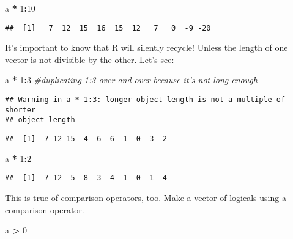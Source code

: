 \documentclass[]{article}
\newenvironment{Shaded}{\begin{snugshade}}{\end{snugshade}}
\newcommand{\DecValTok}[1]{\textcolor[rgb]{0.00,0.00,0.81}{#1}}
\newcommand{\StringTok}[1]{\textcolor[rgb]{0.31,0.60,0.02}{#1}}
\newcommand{\CommentTok}[1]{\textcolor[rgb]{0.56,0.35,0.01}{\textit{#1}}}
\newcommand{\OperatorTok}[1]{\textcolor[rgb]{0.81,0.36,0.00}{\textbf{#1}}}
\newcommand{\NormalTok}[1]{#1}
\begin{document}
\begin{Shaded}
\begin{Highlighting}[]
\NormalTok{a }\OperatorTok{*}\StringTok{ }\DecValTok{1}\OperatorTok{:}\DecValTok{10}
\end{Highlighting}
\end{Shaded}

\begin{verbatim}
##  [1]   7  12  15  16  15  12   7   0  -9 -20
\end{verbatim}

It's important to know that R will silently recycle! Unless the length
of one vector is not divisible by the other. Let's see:

\begin{Shaded}
\begin{Highlighting}[]
\NormalTok{a }\OperatorTok{*}\StringTok{ }\DecValTok{1}\OperatorTok{:}\DecValTok{3} \CommentTok{#duplicating 1:3 over and over because it's not long enough}
\end{Highlighting}
\end{Shaded}

\begin{verbatim}
## Warning in a * 1:3: longer object length is not a multiple of shorter
## object length
\end{verbatim}

\begin{verbatim}
##  [1]  7 12 15  4  6  6  1  0 -3 -2
\end{verbatim}

\begin{Shaded}
\begin{Highlighting}[]
\NormalTok{a }\OperatorTok{*}\StringTok{ }\DecValTok{1}\OperatorTok{:}\DecValTok{2}
\end{Highlighting}
\end{Shaded}

\begin{verbatim}
##  [1]  7 12  5  8  3  4  1  0 -1 -4
\end{verbatim}

This is true of comparison operators, too. Make a vector of logicals
using a comparison operator.

\begin{Shaded}
\begin{Highlighting}[]
\NormalTok{a }\OperatorTok{>}\StringTok{ }\DecValTok{0} 
\end{Highlighting}
\end{Shaded}
\end{document}
